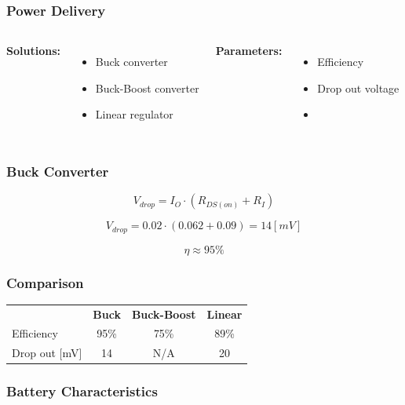 \documentclass[mathserif]{beamer}
\begin{document}
\begin{frame}[c]\frametitle{Power Delivery}
\begin{columns}
\textbf{Solutions:}   
\begin{itemize}
			\item Buck converter
			\item Buck-Boost converter
			\item Linear regulator
\end{itemize}
\textbf{Parameters:}
\begin{itemize}
			\item Efficiency
			\item Drop out voltage
			\item []
\end{itemize}
\end{columns}
\end{frame}

\begin{frame}[c]\frametitle{Buck Converter}
	\begin{equation}
		V_{drop} = I_{O} \cdot (R_{DS(on)}+R_I)
		\label{eq:drop_v_tps62}
	\end{equation}

	\begin{equation}
		V_{drop} = 0.02 \cdot (0.062+0.09) = 14 [mV]
		\label{eq:drop_v_tps62_2}
	\end{equation}

	\begin{equation}
		\eta \approx 95\%
	\end{equation}
\end{frame}

\begin{frame}[c]\frametitle{Comparison}
	\begin{table}[h]
		\begin{tabular}{l|c|c|c}
			  ~				& \textbf{Buck} 	& \textbf{Buck-Boost}& \textbf{Linear}\tabularnewline 
			 Efficiency  	& 95\% 	& 75\%		& 89\%	\\
			 Drop out [mV]	& 14  	& N/A		& 20	\\
		\end{tabular}
	\end{table}
\end{frame}

\begin{frame}[t]\frametitle{Battery Characteristics}
    \begin{figure}[h]
		\centering
		
	\end{figure}
\end{frame}
\end{document}
